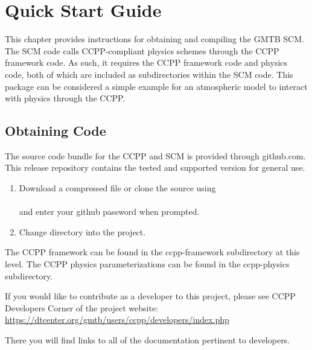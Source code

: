 \chapter{Quick Start Guide}
\label{chapter: quick}
\setlength{\parskip}{12pt}

This chapter provides instructions for obtaining and compiling 
the GMTB SCM. The SCM code calls CCPP-compliant
physics schemes through the CCPP framework code. As such, it requires the
CCPP framework code and physics code, both of which are included as 
subdirectories within the SCM code. This package can be considered a simple example
for an atmospheric model to interact with physics through the CCPP.

\section{Obtaining Code}

The source code bundle for the CCPP and SCM is provided through github.com.  This release repository contains the tested and supported version for general use.  

\begin{enumerate}

	\item Download a compressed file or clone the source using\\

	\\

	and enter your github password when prompted.\\

	\item Change directory into the project.\\


\end{enumerate}

The CCPP framework can be found in the ccpp-framework subdirectory at this level.  The CCPP physics parameterizations can be found in the ccpp-physics subdirectory.

If you would like to contribute as a developer to this project, please see CCPP Developers Corner of the project website:\\

\url{https://dtcenter.org/gmtb/users/ccpp/developers/index.php}

There you will find links to all of the documentation pertinent to developers. 

